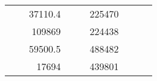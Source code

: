 \begin{table}[H]
\begin{tabular}{|ccrccrccc}
\multicolumn{1}{|c|}{\cellcolor[HTML]{FFFFC7}}                                & \multicolumn{1}{c|}{\cellcolor[HTML]{DAE8FC}}                      & \multicolumn{1}{r|}{\cellcolor[HTML]{DAE8FC}37110.4}   & \multicolumn{1}{c|}{\cellcolor[HTML]{FFFFC7}}                                & \multicolumn{1}{c|}{\cellcolor[HTML]{DAE8FC}}                       & \multicolumn{1}{r|}{\cellcolor[HTML]{DDFDFF}225470}    &                                                                              &                                                                    &                                                        \\ \cline{3-3} \cline{6-6}
\multicolumn{1}{|c|}{\cellcolor[HTML]{FFFFC7}}                                & \multicolumn{1}{c|}{\cellcolor[HTML]{DAE8FC}}                      & \multicolumn{1}{r|}{\cellcolor[HTML]{DDFDFF}109869}    & \multicolumn{1}{c|}{\cellcolor[HTML]{FFFFC7}}                                & \multicolumn{1}{c|}{\cellcolor[HTML]{DAE8FC}}                       & \multicolumn{1}{r|}{\cellcolor[HTML]{DAE8FC}224438}    &                                                                              &                                                                    &                                                        \\ \cline{3-3} \cline{6-6}
\multicolumn{1}{|c|}{\cellcolor[HTML]{FFFFC7}}                                & \multicolumn{1}{c|}{\cellcolor[HTML]{DAE8FC}}                      & \multicolumn{1}{r|}{\cellcolor[HTML]{DAE8FC}59500.5}   & \multicolumn{1}{c|}{\cellcolor[HTML]{FFFFC7}}                                & \multicolumn{1}{c|}{\cellcolor[HTML]{DAE8FC}}                       & \multicolumn{1}{r|}{\cellcolor[HTML]{DDFDFF}488482}    &                                                                              &                                                                    &                                                        \\ \cline{3-3} \cline{6-6}
\multicolumn{1}{|c|}{\cellcolor[HTML]{FFFFC7}}                                & \multicolumn{1}{c|}{\cellcolor[HTML]{DAE8FC}}                      & \multicolumn{1}{r|}{\cellcolor[HTML]{DDFDFF}17694}     & \multicolumn{1}{c|}{\cellcolor[HTML]{FFFFC7}}                                & \multicolumn{1}{c|}{\cellcolor[HTML]{DAE8FC}}                       & \multicolumn{1}{r|}{\cellcolor[HTML]{DAE8FC}439801}    &                                                                              &                                                                    &                                                        \\ \cline{3-3} \cline{6-6}

\end{tabular}
\end{table}
